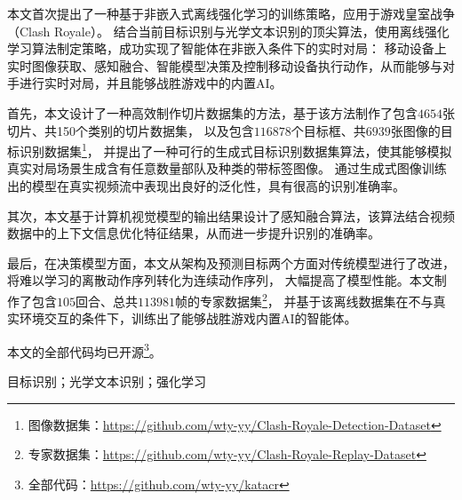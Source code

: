 
\clearpage
\titlespacing{\chapter}{0pt}{0mm}{5mm}


本文首次提出了一种基于非嵌入式离线强化学习的训练策略，应用于游戏皇室战争（Clash Royale）。
结合当前目标识别与光学文本识别的顶尖算法，使用离线强化学习算法制定策略，成功实现了智能体在非嵌入条件下的实时对局：
移动设备上实时图像获取、感知融合、智能模型决策及控制移动设备执行动作，从而能够与对手进行实时对局，并且能够战胜游戏中的内置AI。

首先，本文设计了一种高效制作切片数据集的方法，基于该方法制作了包含$4654$张切片、共150个类别的切片数据集，
以及包含$116878$个目标框、共$6939$张图像的目标识别数据集\footnote{图像数据集：\url{https://github.com/wty-yy/Clash-Royale-Detection-Dataset}\hfill}，
并提出了一种可行的生成式目标识别数据集算法，使其能够模拟真实对局场景生成含有任意数量部队及种类的带标签图像。
通过生成式图像训练出的模型在真实视频流中表现出良好的泛化性，具有很高的识别准确率。

其次，本文基于计算机视觉模型的输出结果设计了感知融合算法，该算法结合视频数据中的上下文信息优化特征结果，从而进一步提升识别的准确率。

最后，在决策模型方面，本文从架构及预测目标两个方面对传统模型进行了改进，将难以学习的离散动作序列转化为连续动作序列，
大幅提高了模型性能。本文制作了包含$105$回合、总共$113981$帧的专家数据集\footnote{专家数据集：\url{https://github.com/wty-yy/Clash-Royale-Replay-Dataset}\hfill}，
并基于该离线数据集在不与真实环境交互的条件下，训练出了能够战胜游戏内置AI的智能体。

本文的全部代码均已开源\footnote{全部代码：\url{https://github.com/wty-yy/katacr}}。

\vspace{\baselineskip}
 目标识别；光学文本识别；强化学习


\clearpage
{}

